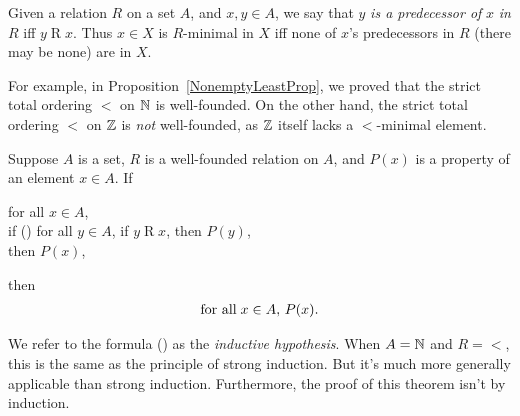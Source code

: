Given a relation $R$ on a set $A$, and $x,y\in A$, we say that $y$
\emph{is a predecessor
%
%
%
of} $x$ \emph{in} $R$ iff $y\mathrel{R}x$.  Thus $x\in X$ is
$R$-minimal in $X$ iff none of $x$'s predecessors in $R$ (there may
be none) are in $X$.

For example, in Proposition~\ref{NonemptyLeastProp}, we proved that
the strict total ordering $<$ on $\mathbb{N}$ is well-founded.  On the other hand,
the strict total ordering $<$ on $\mathbb{Z}$ is \emph{not} well-founded, as $\mathbb{Z}$
itself lacks a $<$-minimal element.

%
%
\begin{theorem}
Suppose $A$ is a set, $R$ is a well-founded relation on $A$, and
$P(x)$ is a property of an element $x\in A$.
If
\begin{ctabbing}
for all $x\in A$, \\
if {\rm(\dag)} for all $y\in A$, if $y\mathrel{R}x$, then $P(y)$, \\
then $P(x)$,
\end{ctabbing}
then
\begin{gather*}
\allowbreak\mbox{for all}\allowbreak\;x\in A,\,P(x) .
\end{gather*}
\end{theorem}

We refer to the formula (\dag) as the \emph{inductive hypothesis}.
%
%
When $A=\mathbb{N}$ and $R={<}$, this is the same as the principle
of strong induction.  But it's much more generally applicable than
strong induction. Furthermore, the proof of this theorem isn't
by induction.

